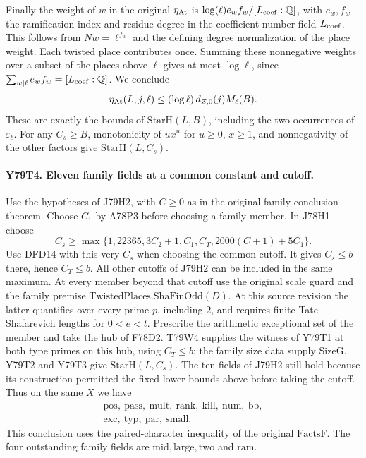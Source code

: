 Finally the weight of $w$ in the original $\eta_{\rm At}$ is
$\log(\ell)e_w f_w/[L_{\rm coef}:\mathbb Q]$, with $e_w,f_w$
the ramification index and residue degree in the coefficient number
field $L_{\rm coef}$. This follows from $Nw=\ell^{f_w}$ and
the defining degree normalization of the place weight. Each twisted
place contributes once. Summing these nonnegative weights over a
subset of the places above $\ell$ gives at most $\log\ell$, since
$\sum_{w\mid\ell}e_w f_w=[L_{\rm coef}:\mathbb Q]$.
We conclude
\[
 \eta_{\rm At}(L,j,\ell)\le
       (\log\ell)\,d_{Z,0}(j) M_\ell(B).
\]
These are exactly the bounds of $\mathrm{StarH}(L,B)$, including the
two occurrences of $\varepsilon_\ell$. For any $C_s\ge B$,
monotonicity of $u x^u$ for $u\ge0$, $x\ge1$, and
nonnegativity of the other factors give $\mathrm{StarH}(L,C_s)$.

\paragraph{Y79T4. Eleven family fields at a common constant and cutoff.}
Use the hypotheses of J79H2, with $C\ge0$ as in the original family
conclusion theorem. Choose $C_1$ by A78P3 before choosing a family
member. In J78H1 choose
\[
 C_s\ge\max\{1,22365,3C_2+1,C_1,C_T,2000(C+1)+5C_1\}.
\]
Use DFD14 with this very $C_s$ when choosing the common cutoff.
It gives $C_s\le b$ there, hence $C_T\le b$.
All other cutoffs of J79H2 can be included in the same maximum.
At every member beyond that cutoff use the original scale guard and
the family premise $\mathrm{TwistedPlaces.ShaFinOdd}(D)$. At this
source revision the latter quantifies over every prime $p$, including
$2$, and requires finite Tate--Shafarevich lengths for $0<e<t$.
Prescribe the arithmetic exceptional set of the member
and take the hub of F78D2. T79W4 supplies the witness of Y79T1 at
both type primes on this hub, using $C_T\le b$; the family size
data supply $\mathrm{SizeG}$. Y79T2 and Y79T3 give
$\mathrm{StarH}(L,C_s)$. The ten fields of J79H2 still hold
because its construction permitted the fixed lower bounds above
before taking the cutoff. Thus on the same $X$ we have
\[
 \begin{gathered}
 \mathrm{pos},\ \mathrm{pass},\ \mathrm{mult},\ \mathrm{rank},\
 \mathrm{kill},\ \mathrm{num},\ \mathrm{bb},\\
 \mathrm{exc},\ \mathrm{typ},\ \mathrm{par},\ \mathrm{small}.
 \end{gathered}
\]
This conclusion uses the paired-character inequality of the original
$\mathrm{FactsF}$. The four outstanding family fields are
$\mathrm{mid},\mathrm{large},\mathrm{two}$ and $\mathrm{ram}$.
